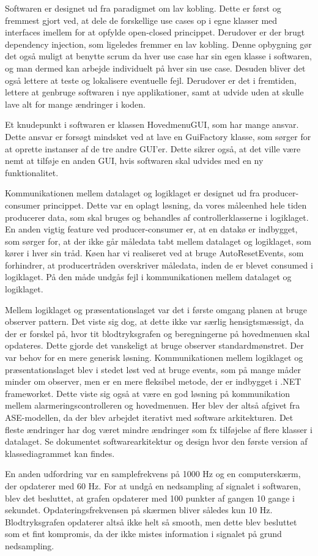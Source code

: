 Softwaren er designet ud fra paradigmet om lav kobling. Dette er først og fremmest gjort ved, at dele de forskellige use cases op i egne klasser med interfaces imellem for at opfylde open-closed princippet. Derudover er der brugt dependency injection, som ligeledes fremmer en lav kobling. Denne opbygning gør det også muligt at benytte scrum  da hver use case har sin egen klasse i softwaren, og man dermed kan arbejde individuelt på hver sin use case. Desuden bliver det også lettere at teste og lokalisere eventuelle fejl. Derudover er det i fremtiden, lettere at genbruge softwaren i nye applikationer, samt at udvide uden at skulle lave alt for mange ændringer i koden. 

Et knudepunkt i softwaren er klassen HovedmenuGUI, som har mange ansvar. Dette ansvar er forsøgt mindsket ved at lave en GuiFactory klasse, som sørger for at oprette instanser af de tre andre GUI’er. Dette sikrer også, at det ville være nemt at tilføje en anden GUI, hvis softwaren skal udvides med en ny funktionalitet. 

Kommunikationen mellem datalaget og logiklaget er designet ud fra producer-consumer princippet. Dette var en oplagt løsning, da vores måleenhed hele tiden producerer data, som skal bruges og behandles af controllerklasserne i logiklaget. En anden vigtig feature ved producer-consumer er, at en datakø er indbygget, som sørger for, at der ikke går måledata tabt mellem datalaget og logiklaget, som kører i hver sin tråd. Køen har vi realiseret ved at bruge AutoResetEvents, som forhindrer, at producertråden overskriver måledata, inden de er blevet consumed i logiklaget. På den måde undgås fejl i kommunikationen mellem datalaget og logiklaget.

Mellem logiklaget og præsentationslaget var det i første omgang planen at bruge observer pattern. Det viste sig dog, at dette ikke var særlig hensigtsmæssigt, da der er forskel på, hvor tit blodtryksgrafen og beregningerne på hovedmenuen skal opdateres. Dette gjorde det vanskeligt at bruge observer standardmønstret. Der var behov for en mere generisk løsning. Kommunikationen mellem logiklaget og præsentationslaget blev i stedet løst ved at bruge events, som på mange måder minder om observer, men er en mere fleksibel metode, der er indbygget i .NET frameworket. Dette viste sig også at være en god løsning på kommunikation mellem alarmeringscontrolleren og hovedmenuen. Her blev der altså afgivet fra ASE-modellen, da der blev arbejdet iterativt med software arkitekturen. Det fleste ændringer har dog været mindre ændringer som fx tilføjelse af flere klasser i datalaget. Se dokumentet softwarearkitektur og design hvor den første version af klassediagrammet kan findes.  

En anden udfordring var en samplefrekvens på 1000 Hz og en computerskærm, der opdaterer med 60 Hz. For at undgå en nedsampling af signalet i softwaren, blev det besluttet, at grafen opdaterer med 100 punkter af gangen 10 gange i sekundet. Opdateringsfrekvensen på skærmen bliver således kun 10 Hz. Blodtryksgrafen opdaterer altså ikke helt så smooth, men dette blev besluttet som et fint kompromis, da der ikke mistes information i signalet på grund nedsampling. 
